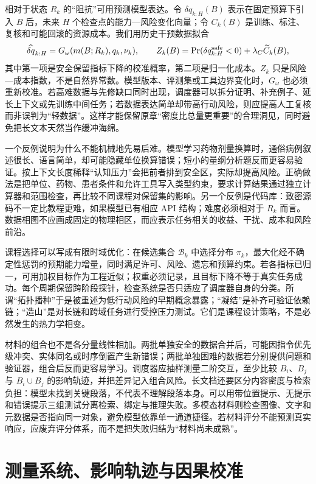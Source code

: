 相对于状态 $R_k$ 的“阻抗”可用预测模型表达。令 $\delta q_{k:H}(B)$ 表示在固定预算下引入 $B$ 后，未来 $H$ 个检查点的能力—风险变化向量；令 $C_k(B)$ 是训练、标注、复核和可能回滚的资源成本。我们用历史干预数据拟合
\begin{equation}
\widehat{\delta q}_{k:H}=G_\omega(m(B;R_k),q_k,\nu_k),\qquad
Z_k(B)=\Pr(\delta q^{\rm safe}_{k:H}<0)+\lambda_C\widetilde C_k(B),
\end{equation}
其中第一项是安全保留指标下降的校准概率，第二项是归一化成本。$Z_k$ 只是风险—成本指数，不是自然界常数。模型版本、评测集或工具边界变化时，$G_\omega$ 也必须重新校准。若高难数据与先修缺口同时出现，调度器可以拆分证明、补充例子、延长上下文或先训练中间任务；若数据表达简单却带高行动风险，则应提高人工复核而非误判为“轻数据”。这样才能保留原章“密度比总量更重要”的合理洞见，同时避免把长文本天然当作缓冲海绵。

一个反例说明为什么不能机械地先易后难。模型学习药物剂量换算时，通俗病例叙述很长、语言简单，却可能隐藏单位换算错误；短小的量纲分析题反而更容易验证。按上下文长度稀释“认知压力”会把前者排到安全区，实际却提高风险。正确做法是把单位、药物、患者条件和允许工具写入类型约束，要求计算结果通过独立计算器和范围检查，再比较不同课程对保留集的影响。另一个反例是代码库：致密源码不一定比教程更难，如果模型已有相应 API 结构；难度必须相对于 $R_k$ 而言。数据相图不应画成固定的物理相区，而应表示任务相关的收益、干扰、成本和风险前沿。

课程选择可以写成有限时域优化：在候选集合 $\mathcal B_k$ 中选择分布 $\pi_k$，最大化经不确定性惩罚的预期能力增量，同时满足许可、风险、遗忘和预算约束。若各指标已归一，可用加权目标作为工程近似；权重必须记录，且目标下降不等于真实任务成功。每个周期保留跨阶段探针，检查系统是否只适应了调度器自身的分类。所谓“拓扑播种”于是被重述为低行动风险的早期概念暴露；“凝结”是补齐可验证依赖链；“造山”是对长链和跨域任务进行受控压力测试。它们是课程设计策略，不是必然发生的热力学相变。

材料的组合也不是各分量线性相加。两批单独安全的数据合并后，可能因指令优先级冲突、实体同名或时序倒置产生新错误；两批单独困难的数据若分别提供问题和验证器，组合后反而更容易学习。调度器应抽样测量二阶交互，至少比较 $B_i$、$B_j$ 与 $B_i\cup B_j$ 的影响轨迹，并把差异记入组合风险。长文档还要区分内容密度与检索负担：模型未找到关键段落，不代表不理解段落本身。可以用带位置提示、无提示和错误提示三组测试分离检索、绑定与推理失败。多模态材料则检查图像、文字和元数据是否指向同一对象，避免模型依靠单一通道捷径。若材料评分不能预测真实响应，应废弃评分体系，而不是把失败归结为“材料尚未成熟”。

\section{测量系统、影响轨迹与因果校准}
\label{sec:cognitive_mass_spectrometer_engineering}

